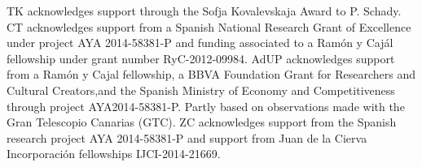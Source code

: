 \documentclass{aa}    %
\begin{document}
\begin{acknowledgements}
TK acknowledges support through the Sofja Kovalevskaja Award to P. Schady. 
CT acknowledges support from a Spanish National Research Grant of Excellence under project AYA 2014-58381-P and funding associated to a Ramón y Cajál fellowship under grant number RyC-2012-09984.
AdUP acknowledges support from a Ramón y Cajal fellowship, a BBVA Foundation Grant for Researchers and Cultural Creators,and the Spanish Ministry of Economy and Competitiveness through project AYA2014-58381-P.
Partly based on observations made with the Gran Telescopio Canarias (GTC).
ZC acknowledges support from the Spanish research project AYA 2014-58381-P and support from Juan de la Cierva Incorporaci\'on fellowships IJCI-2014-21669. 

\end{acknowledgements}



\end{document}
